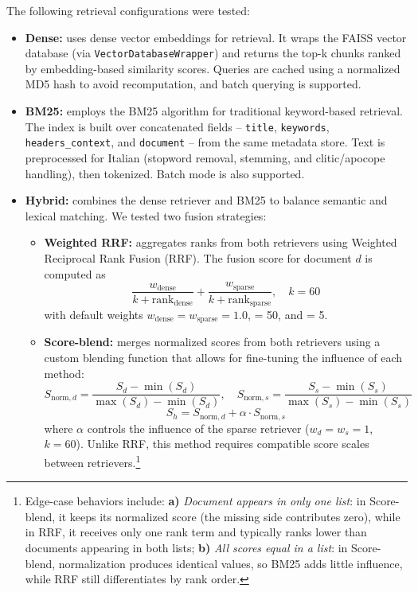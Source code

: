 \begin{spacing}{1.5}
The following retrieval configurations were tested:
\begin{itemize}
    \item \textbf{Dense:} uses dense vector embeddings for retrieval. It wraps the FAISS vector database (via \texttt{VectorDatabaseWrapper}) and returns the top-k chunks ranked by embedding-based similarity scores. Queries are cached using a normalized MD5 hash to avoid recomputation, and batch querying is supported.
    \item \textbf{BM25:} employs the BM25 algorithm for traditional keyword-based retrieval. The index is built over concatenated fields -- \texttt{title}, \texttt{keywords}, \texttt{headers\_context}, and \texttt{document} -- from the same metadata store. Text is preprocessed for Italian (stopword removal, stemming, and clitic/apocope handling), then tokenized. Batch mode is also supported.
    \item \textbf{Hybrid:} combines the dense retriever and BM25 to balance semantic and lexical matching. We tested two fusion strategies:
    \begin{itemize}
            \item \textbf{Weighted RRF:} aggregates ranks from both retrievers using Weighted Reciprocal Rank Fusion (RRF). The fusion score for document $d$ is computed as
\[
\frac{w_\mathrm{dense}}{k + \mathrm{rank}_\mathrm{dense}} + \frac{w_\mathrm{sparse}}{k + \mathrm{rank}_\mathrm{sparse}}, \quad k = 60
\]
with default weights $w_{\text{dense}} = w_{\text{sparse}} = 1.0$,  = 50, and  = 5.
            \item \textbf{Score-blend:} merges normalized scores from both retrievers using a custom blending function that allows for fine-tuning the influence of each method:
\[
S_{\text{norm},d} = \frac{S_d - \min(S_d)}{\max(S_d) - \min(S_d)}, \quad  
S_{\text{norm},s} = \frac{S_s - \min(S_s)}{\max(S_s) - \min(S_s)}
\]
\[
S_h = S_{\text{norm},d} + \alpha \cdot S_{\text{norm},s}
\]
where $\alpha$ controls the influence of the sparse retriever ($w_d = w_s = 1$, $k = 60$). \citep{wang_searching_2024} Unlike RRF, this method requires compatible score scales between retrievers.\footnote{Edge-case behaviors include: \textbf{a)} \textit{Document appears in only one list}: in Score-blend, it keeps its normalized score (the missing side contributes zero), while in RRF, it receives only one rank term and typically ranks lower than documents appearing in both lists; \textbf{b)} \textit{All scores equal in a list}: in Score-blend, normalization produces identical values, so BM25 adds little influence, while RRF still differentiates by rank order.}
\end{itemize}
\end{itemize}
\vspace{1em}


\end{spacing}
